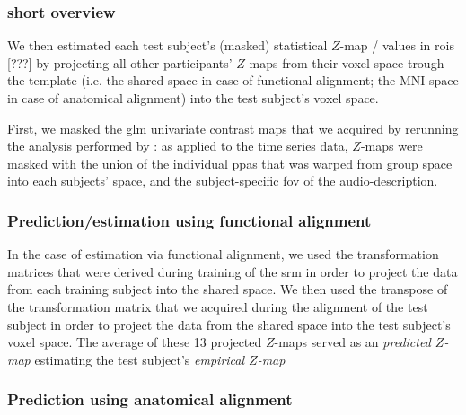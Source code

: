 


\subsubsection{short overview}
%
We then estimated each test subject's (masked) statistical $Z$-map / values in
\acp{roi} [???] by projecting all other participants' $Z$-maps from their voxel
space trough the template (i.e. the shared space in case of functional
alignment; the MNI space in case of anatomical alignment) into the test
subject's voxel space.

%
First, we masked the \ac{glm} univariate contrast maps that we acquired by
rerunning the analysis performed by \citet{hanke2016simultaneous}:
%
as applied to the time series data, $Z$-maps were masked with the union of the
individual \acp{ppa} \citep[s.][]{haeusler2022processing} that was warped from
group space into each subjects' space, and the subject-specific \ac{fov} of the
audio-description.

\subsubsection{Prediction/estimation using functional alignment}

In the case of estimation via functional alignment, we used the transformation
matrices that were derived during training of the \ac{srm} in order to project
the data from each training subject into the shared space.
We then used the transpose of the transformation matrix that we acquired during
the alignment of the test subject in order to project the data from the shared
space into the test subject's voxel space.
The average of these 13 projected $Z$-maps served as an \textit{predicted
$Z$-map} estimating the test subject's \textit{empirical $Z$-map}


\subsubsection{Prediction using anatomical alignment}

